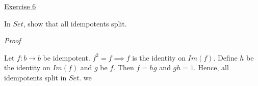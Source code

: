 \noindent
\underline{Exercise 6}
\vspace{2mm}

In $Set$, show that all idempotents split.

\vspace{2mm}

\noindent
\emph{Proof}

Let $f : b \to b$ be idempotent. $f^2 = f \implies f$ is the identity on $Im(f)$. Define $h$ be the identity on $Im(f)$ and $g$ be $f$. Then $f = hg$ and $gh = 1$. Hence, all idempotents split in $Set$.
 we

\vspace{2mm}
